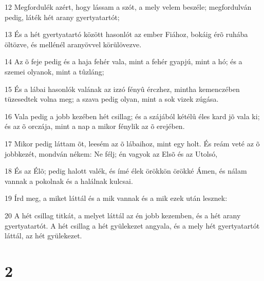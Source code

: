 \par 12 Megfordulék azért, hogy lássam a szót, a mely velem beszéle; megfordulván pedig, láték hét arany gyertyatartót;
\par 13 És a hét gyertyatartó között hasonlót az ember Fiához, bokáig érõ ruhába öltözve, és  mellénél aranyövvel körülövezve.
\par 14 Az õ feje pedig és a haja fehér vala, mint a fehér gyapjú, mint a hó; és a szemei olyanok, mint a tûzláng;
\par 15 És a lábai hasonlók valának az izzó fényû érczhez, mintha kemenczében tüzesedtek volna meg; a szava pedig olyan, mint a sok vizek zúgása.
\par 16 Vala pedig a jobb kezében hét csillag; és a szájából kétélû éles kard jõ vala ki; és az õ orczája, mint a nap a mikor fénylik az õ erejében.
\par 17 Mikor pedig láttam õt, leesém az õ lábaihoz, mint egy holt. És reám veté az õ jobbkezét, mondván nékem: Ne félj; én vagyok az Elsõ és  az Utolsó,
\par 18 És az Élõ; pedig halott valék, és ímé élek örökkön örökké Ámen, és nálam vannak a pokolnak és a halálnak kulcsai.
\par 19 Írd meg, a miket láttál és a mik vannak és a mik ezek után lesznek:
\par 20 A hét csillag titkát, a melyet láttál az én jobb kezemben, és a hét arany gyertyatartót. A hét csillag a hét gyülekezet angyala, és a mely hét gyertyatartót láttál, az hét gyülekezet.

\chapter{2}

